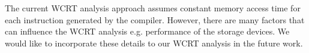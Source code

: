 The current WCRT analysis approach assumes constant memory access time
for each instruction generated by the compiler. However, there are many
factors
\cite{Zhang:2014:DCR:2593069.2593124,Qin:2010:DBA:1878961.1878991,Chen:2013:DDH:2555692.2555699}
that can influence the WCRT analysis e.g. performance of the storage
devices. We would like to incorporate these details to our WCRT analysis
in the future work.






